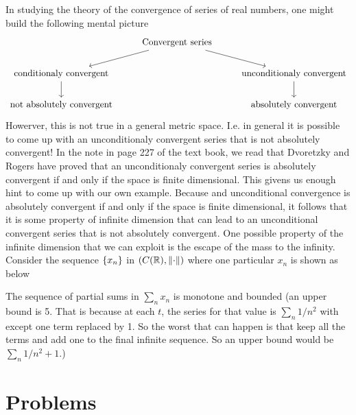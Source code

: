 \begin{summary}
	In studying the theory of the convergence of series of real numbers, one might build the following mental picture
	\[\begin{tikzcd}
		& {\text{Convergent series}} \\
		{\text{conditionaly convergent}} && {\text{unconditionaly convergent}} \\
		{\text{not absolutely convergent}} && {\text{absolutely convergent}}
		\arrow[from=1-2, to=2-1]
		\arrow[from=1-2, to=2-3]
		\arrow[from=2-1, to=3-1]
		\arrow[from=2-3, to=3-3]
	\end{tikzcd}\]
	Howerver, this is not true in a general metric space. I.e. in general it is possible to come up with an unconditionaly convergent series that is not absolutely convergent! In the note in page 227 of the text book, we read that Dvoretzky and Rogers have proved that an unconditionaly convergent series is absolutely convergent if and only if the space is finite dimensional. This givens us enough hint to come up with our own example. Because and unconditional convergence is absolutely convergent if and only if the space is finite dimensional, it follows that it is some property of infinite dimension that can lead to an unconditional convergent series that is not absolutely convergent. One possible property of the infinite dimension that we can exploit is the escape of the mass to the infinity. Consider the sequence $ \{x_n\} $ in $(C(\mathbb{R}),\norm{\cdot}) $ where one particular $ x_n $ is shown as below
	
	The sequence of partial sums in $ \sum_n x_n $ is monotone and bounded (an upper bound is 5. That is because at each $ t $, the series for that value is $ \sum_n 1/n^2 $ with except one term replaced by 1. So the worst that can happen is that keep all the terms and add one to the final infinite sequence. So an upper bound would be $ \sum_n 1/n^2 + 1 $.)
\end{summary}

\newpage


\section{Problems}
